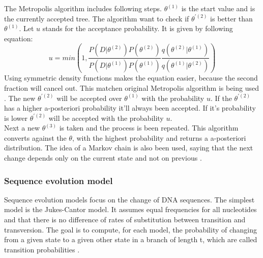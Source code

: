 \documentclass[12pt]{article} %
\begin{document}
	The Metropolis algorithm includes following steps. $\theta^{(1)}$ is the start value and is the currently accepted tree. The algorithm want to check if $\theta^{'(2)}$ is better than $\theta^{(1)}$. Let $u$ stands for the acceptance probability. It is given by following equation: 
	\begin{equation}
	u =	min(1,
	\frac
	{P(D|\theta^{(2)})P(\theta^{(2)})} 
	{P(D|\theta^{(1)})P(\theta^{(1)})}
	\frac
	{q(\theta^{(2)}|\theta^{(1)})}
	{q(\theta^{(1)}|\theta^{(2)})}
	)
	\label{frac:acceptance_prop}
	\end{equation}
	Using symmetric density functions makes the equation easier, because the second fraction will cancel out. This matchen original Metropolis algorithm is being used \citep{fahrmeir2009}. The new $\theta^{'(2)}$ will be accepted over $\theta^{(1)}$ with the probability $u$. If the $\theta^{'(2)}$ has a higher a-posteriori probability it'll always been accepted. If it's probability is lower $\theta^{'(2)}$ will be accepted with the probability $u$. \\
	
	Next a new $\theta^{(3)}$ is taken and the process is been repeated. This algorithm converts against the $\theta$, with the highest probability and returns a a-posteriori distribution. The idea of a Markov chain is also been used, saying that the next change depends only on the current state and not on previous \citep{felsenstein2003}.
	

	
	
	
	
	
	
	
	
	
	
	
	
	
	
	
	
	
	
	
	
	\subsubsection{Sequence evolution model}
	Sequence evolution models focus on the change of DNA sequences. The simplest model is the Jukes-Cantor model. It assumes equal frequencies for all nucleotides and that there is no difference of rates of substitution between transition and transversion. The goal is to compute, for each model, the probability of changing from a given state to a given other state in a branch of length t, which are called transition probabilities \citep{felsenstein2003}.
	
\end{document}
